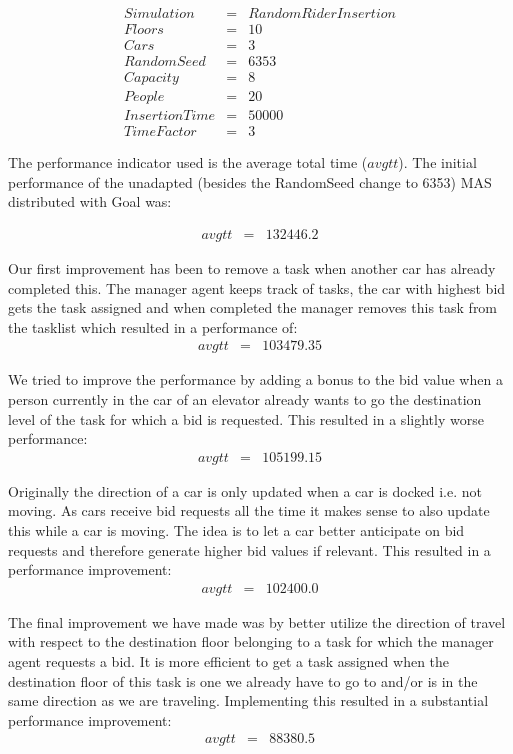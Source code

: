\documentclass[a4paper,11pt]{article}
\begin{document}
\[\begin{array}{lcl}
Simulation & = & Random Rider Insertion\\
Floors & = & 10\\
Cars & = & 3\\
RandomSeed & = & 6353\\
Capacity & = & 8\\
People & = & 20\\
InsertionTime & = & 50000\\
TimeFactor & = & 3
\end{array}\] 

\pagebreak

The performance indicator used is the average total time ($avgtt$). The initial performance of the unadapted (besides the RandomSeed change to 6353) MAS distributed with Goal was:

\[\begin{array}{lcl}
avgtt & = & 132446.2
\end{array}\]

Our first improvement has been to remove a task when another car has already completed this. The manager agent keeps track of tasks, the car with highest bid gets the task assigned and when completed the manager removes this task from the tasklist which resulted in a performance of:
\[\begin{array}{lcl}
avgtt & = & 103479.35
\end{array}\]

We tried to improve the performance by adding a bonus to the bid value when a person currently in the car of an elevator already wants to go the destination level of the task for which a bid is requested. This resulted in a slightly worse performance:
\[\begin{array}{lcl}
avgtt & = & 105199.15
\end{array}\]

Originally the direction of a car is only updated when a car is docked i.e. not moving. As cars receive bid requests all the time it makes sense to also update this while a car is moving. The idea is to let a car better anticipate on bid requests and therefore generate higher bid values if relevant. This resulted in a performance improvement: 
\[\begin{array}{lcl}
avgtt & = & 102400.0
\end{array}\]

The final improvement we have made was by better utilize the direction of travel with respect to the destination floor belonging to a task for which the manager agent requests a bid. It is more efficient to get a task assigned when the destination floor of this task is one we already have to go to and/or is in the same direction as we are traveling. Implementing this resulted in a substantial performance improvement:
\[\begin{array}{lcl}
avgtt & = & 88380.5
\end{array}\]
\end{document}
